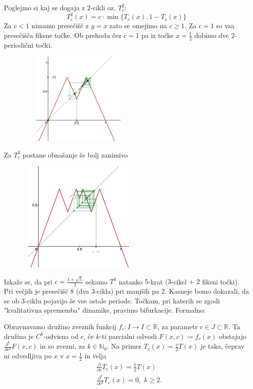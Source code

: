 \documentclass{article}
\newcommand{\N}{\mathbb{N}}
\newcommand{\R}{\mathbb{R}}
\begin{document}
\noindent
Poglejmo si kaj se dogaja z $2$-cikli oz. $T_c^2$:
$$
T_c^2(x) = c\cdot \min\{ T_c(x), 1 - T_c(x)\}
$$
Za $c < 1$ nimamo presečišč z $y = x$ zato se omejimo na $c \geq 1$. Za $c=1$
so vsa presečišča fiksne točke. Ob prehodu čez $c = 1$ pa iz točke $x = \frac{1}{2}$
dobimo dve $2$-periodični točki.
\begin{figure}[h!]
    \begin{center}
        \includegraphics[width=6cm, height=4.6cm]{Grafi/cobweb15.png}
    \end{center}
\end{figure}
\noindent
\newpage
Za $T_c^3$ postane obnašanje še bolj zanimivo 
\begin{figure}[h!]
    \begin{center}
        \includegraphics[width=6cm, height=5.5cm]{Grafi/cobweb16.png}
    \end{center}
\end{figure}
Izkaže se, da pri $c = \frac{1 + \sqrt{5}}{2}$ sekamo $T^3$ natanko $5$-krat 
($3$-cikel $+$ $2$ fiksni točki). Pri večjih je presečišč $8$ (dva $3$-cikla) 
pri manjših pa $2$. Kasneje bomo dokazali, da se ob $3$-ciklu pojavijo še vse 
ostale periode.
Točkam, pri katerih se zgodi "kvalitativna sprememba" dinamike, pravimo bifurkacije.
\newline
Formalno:

Obravnavamo družino zveznih funkcij $f_c: I \rightarrow I \subset \R$, 
za parametr $c\in J \subset \R$. Ta družina je $C^k$-odvisna od $c$, če 
$k$-ti parcialni odvodi $F(x, c) \coloneqq f_c(x)$ obstajajo
$\frac{\partial^k}{\partial c^k} F(x, c)$ in so zvezni, za $k\in \N_0$. 
Na primer $T_c(x) = \frac{c}{2} T(x)$ je taka, čeprav ni odvedljiva po $x$ v 
$x = \frac{1}{2}$ in velja
\begin{align*}
&\frac{\partial}{\partial c} T_c(x) = \frac{1}{2} T(x) \\ 
&\frac{\partial^k}{\partial c^k} T_c(x) = 0, \,\, k \geq 2.
\end{align*}
\end{document}
